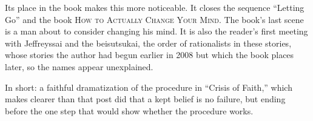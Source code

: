 \begin{afterword}
Its place in the book makes this more noticeable. It closes the sequence ``Letting Go'' and the book \textsc{How to Actually Change Your Mind}. The book's last scene is a man about to consider changing his mind. It is also the reader's first meeting with Jeffreyssai and the beisutsukai, the order of rationalists in these stories, whose stories the author had begun earlier in 2008 but which the book places later, so the names appear unexplained.

In short: a faithful dramatization of the procedure in ``Crisis of Faith,'' which makes clearer than that post did that a kept belief is no failure, but ending before the one step that would show whether the procedure works.
\end{afterword}
